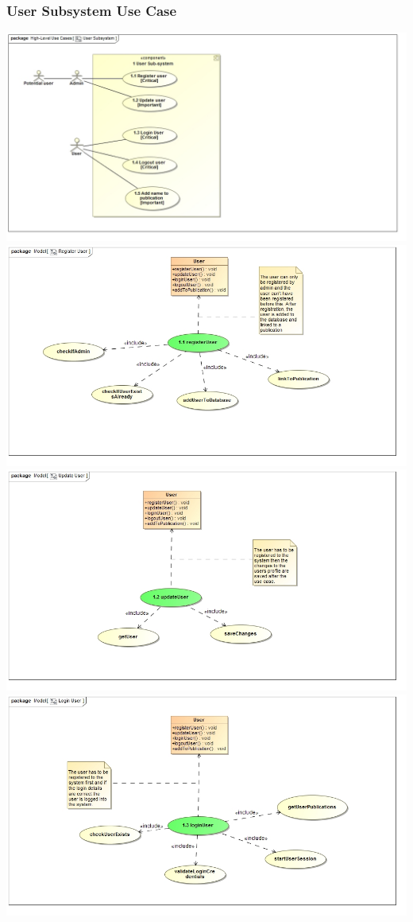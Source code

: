 \documentclass{article}
\begin{document}
	\subsubsection{User Subsystem Use Case}
	\includegraphics[width=\textwidth]{UserSubsystem}
	\includegraphics[width=\textwidth]{RegisterUser}
	\includegraphics[width=\textwidth]{UpdateUser}
	\includegraphics[width=\textwidth]{LoginUser}
\end{document}

